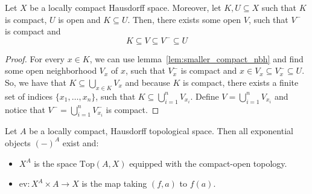 \begin{corollary}\label{cor:sandwitch} Let $X$ be a locally compact Hausdorff space. Moreover, let $K,U\subseteq X$ such that $K$ is compact, $U$ is open and $K\subseteq U$. Then, there exists some open $V$, such that $V^-$ is compact and
\[K\subseteq V\subseteq V^-\subseteq U\]
\end{corollary}
\begin{proof}
For every $x\in K$, we can use lemma~\ref{lem:smaller_compact_nbh} and find some open neighborhood $V_x$ of $x$, such that $V_x^-$ is compact and $x\in V_x\subseteq V_x^-\subseteq U$. So, we have that $K\subseteq\bigcup_{x\in K}V_x$ and because $K$ is compact, there exists a finite set of indices $\{x_1,\ldots,x_n\}$, such that $K\subseteq\bigcup_{i=1}^nV_{x_i}$. Define $V=\bigcup_{i=1}^nV_{x_i}$ and notice that $V^-=\bigcup_{i=1}^nV_{x_i}^-$ is compact.
\end{proof}
\begin{theorem}\label{thm:top_exponential} Let $A$ be a locally compact, Hausdorff topological space. Then all exponential objects $(-)^A$ exist and:
\begin{itemize}
\item $X^A$ is the space $\mathrm{Top}(A,X)$ equipped with the compact-open topology.
\item $\mathrm{ev}:X^A\times A\to X$ is the map taking $(f,a)$ to $f(a)$.
\end{itemize}
\end{theorem}
